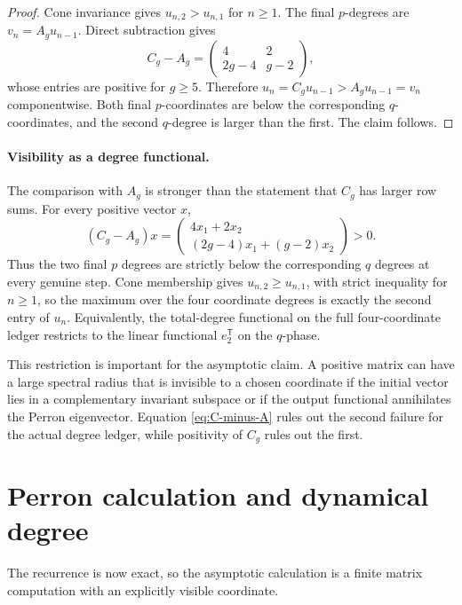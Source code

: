 \documentclass[11pt]{article}
\theoremstyle{remark}
\numberwithin{equation}{section}
\begin{document}
\begin{proof}
Cone invariance gives \(u_{n,2}>u_{n,1}\) for \(n\geq1\).  The final
\(p\)-degrees are \(v_n=A_gu_{n-1}\).  Direct subtraction gives
\[
 C_g-A_g=
 \begin{pmatrix}
  4&2\\
  2g-4&g-2
 \end{pmatrix},
\]
whose entries are positive for \(g\geq5\).  Therefore
\(u_n=C_gu_{n-1}>A_gu_{n-1}=v_n\) componentwise.  Both final \(p\)-coordinates
are below the corresponding \(q\)-coordinates, and the second \(q\)-degree is
larger than the first.  The claim follows.
\end{proof}

\paragraph{Visibility as a degree functional.}
The comparison with $A_g$ is stronger than the statement that $C_g$ has
larger row sums.  For every positive vector $x$,
\[
 (C_g-A_g)x
 =\begin{pmatrix}4x_1+2x_2\\(2g-4)x_1+(g-2)x_2\end{pmatrix}>0.
\tag{C-minus-A}\label{eq:C-minus-A}
\]
Thus the two final $p$ degrees are strictly below the corresponding $q$
degrees at every genuine step.  Cone membership gives
$u_{n,2}\geq u_{n,1}$, with strict inequality for $n\geq1$, so the maximum
over the four coordinate degrees is exactly the second entry of $u_n$.
Equivalently, the total-degree functional on the full four-coordinate ledger
restricts to the linear functional $e_2^{\mathsf T}$ on the $q$-phase.

This restriction is important for the asymptotic claim.  A positive matrix can
have a large spectral radius that is invisible to a chosen coordinate if the
initial vector lies in a complementary invariant subspace or if the output
functional annihilates the Perron eigenvector.  Equation \eqref{eq:C-minus-A}
rules out the second failure for the actual degree ledger, while positivity of
$C_g$ rules out the first.

\section{Perron calculation and dynamical degree}\label{sec:perron}

The recurrence is now exact, so the asymptotic calculation is a finite
matrix computation with an explicitly visible coordinate.
\end{document}
